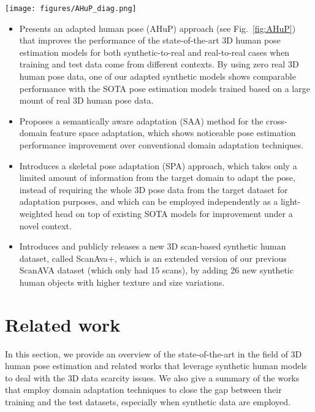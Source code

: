 \documentclass[twocolumn]{svjour3}          \smartqed  \usepackage{graphicx}
\newcommand{\figref}[1]{Fig.~\ref{#1}}
\newcommand{\figAHuP}{
\begin{figure*}[t]
    \centering
    \texttt{[image: figures/AHuP\_diag.png]}
    \caption{The proposed adapted human pose (AHuP) framework,
    where SAA stands for the semantically aware adaptation approach, SPA stands for the  skeletal  pose  adaptation.  stands for the feature extractor,  for task head,  for discriminator and  stands for the \textit{i}-th channel of .}
    \label{fig:AHuP}
    \vspace{-.2in}
\end{figure*}
}
\begin{document}
\figAHuP
\begin{itemize}
\item Presents an adapted human pose (AHuP) approach (see \figref{fig:AHuP}) that improves the performance of the state-of-the-art 3D human pose estimation models  for both synthetic-to-real and real-to-real cases when training and test data come from different contexts. By using zero real 3D human pose data, one of our adapted synthetic models shows comparable performance with the SOTA pose estimation models trained based on a large mount of  real 3D human pose data. 


\item Proposes a semantically aware adaptation (SAA) method for the cross-domain feature space adaptation, which shows noticeable pose estimation performance improvement over conventional domain adaptation techniques. 

\item Introduces a skeletal pose adaptation (SPA) approach, which takes only a limited amount of information from the target domain to adapt the pose, instead of requiring the whole 3D pose data from the target dataset for adaptation purposes, and which can be  employed independently as a light-weighted head on top of existing SOTA models for improvement under a novel context.




\item Introduces and publicly releases a new 3D scan-based synthetic human dataset, called ScanAva+, which is an extended version of our previous ScanAVA dataset (which only had 15 scans), by adding 26 new synthetic human objects with higher texture and size variations.  
\end{itemize}










\section{Related work}
In this section, we provide an overview of the state-of-the-art in the field of 3D human pose estimation and related works that leverage synthetic human models to deal with the 3D data scarcity issues. We also give a summary of the works that employ domain adaptation techniques to close the gap between their training and the test datasets, especially when  synthetic data are employed. 
\end{document}
